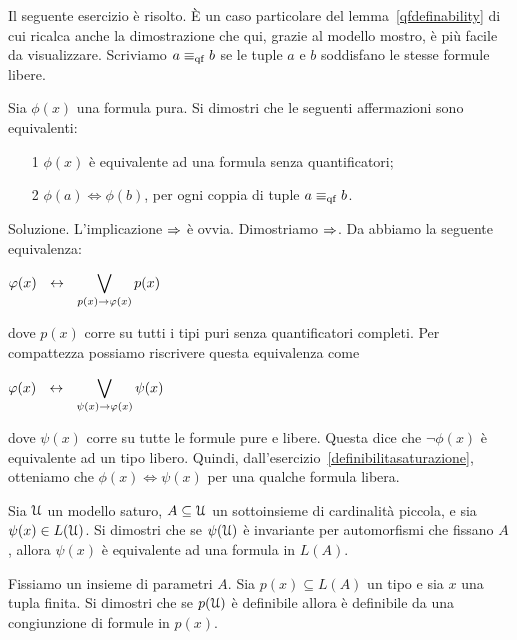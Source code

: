 Il seguente esercizio \`e risolto. \`E un caso particolare del lemma~\ref{qfdefinability} di cui ricalca anche la dimostrazione che qui, grazie al modello mostro, \`e pi\`u facile da visualizzare.  Scriviamo \emph{$a\equiv_{\rm qf}b$\/} se le tuple $a$ e $b$ soddisfano le stesse formule libere.

\begin{exercise}\label{qfdefinabilitysemplice}
Sia $\phi(x)$ una formula pura. Si dimostri che le seguenti affermazioni sono equivalenti:
\begin{itemize}
\item[1] $\phi(x)$ \`e equivalente ad una formula senza quantificatori;
\item[2] $\phi(a)\iff\phi(b)$, per ogni coppia di tuple $a\equiv_{\rm qf} b$.
\end{itemize}
Soluzione. L'implicazione $\Rightarrow$ \`e ovvia. Dimostriamo $\Rightarrow$. Da  abbiamo la seguente equivalenza:

\hfil$\displaystyle\phi(x)\ \ \iff\ \ \bigvee_{p(x)\imp\phi(x)} p(x)$

dove $p(x)$ corre su tutti i tipi puri senza quantificatori completi. Per compattezza possiamo riscrivere questa equivalenza come 

\hfil$\displaystyle\phi(x)\ \ \iff\ \ \bigvee_{\psi(x)\imp\phi(x)} \psi(x)$

dove $\psi(x)$ corre su tutte le formule pure e libere. Questa dice che $\neg\phi(x)$ \`e equivalente ad un tipo libero. Quindi, dall'esercizio~\ref{definibilitasaturazione}, otteniamo che $\phi(x)\iff\psi(x)$ per una qualche formula libera.\QED
\end{exercise}



\begin{exercise}
Sia $\EuScript U$ un modello saturo, $A\subseteq\EuScript U$ un sottoinsieme di cardinalit\`a piccola,  e sia $\psi(x)\in L(\EuScript U)$. Si dimostri che se $\psi(\EuScript U)$ \`e invariante per automorfismi che fissano $A$, allora $\psi(x)$ \`e equivalente ad una formula in $L(A)$.
\end{exercise}



\begin{exercise} 
Fissiamo un insieme di parametri $A$. Sia $p(x)\subseteq L(A)$ un tipo e sia $x$ una tupla finita. Si dimostri che se $p(\EuScript U)$ \`e definibile allora \`e definibile da una congiunzione di formule in $p(x)$.\QED 
\end{exercise}

